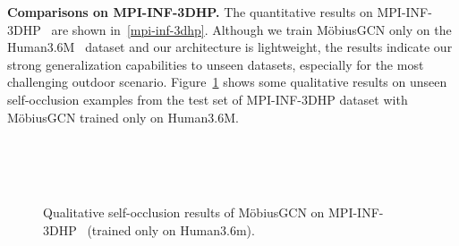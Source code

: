 \documentclass[runningheads]{llncs}
\begin{document}
\textbf{Comparisons on MPI-INF-3DHP.} The quantitative results on MPI-INF-3DHP~\cite{mono-3dhp2017} are shown in~\autoref{mpi-inf-3dhp}. Although we train M\"obiusGCN only on the Human3.6M~\cite{h36m_pami} dataset and our architecture is lightweight, the results indicate our strong generalization capabilities to unseen datasets, especially for the most challenging outdoor scenario.
Figure~\ref{qual-res-mpi-inf} shows some qualitative results on unseen self-occlusion examples from the test set of MPI-INF-3DHP dataset with M\"obiusGCN trained only on Human3.6M. 
\begin{figure}
\centering
{}
\quad
{}
\quad
{}\\ 
\quad
{}
\quad
{} \\
\quad
{}
\quad
{} \\
\caption{\scriptsize{Qualitative self-occlusion results of M\"obiusGCN on MPI-INF-3DHP~\cite{mono-3dhp2017} (trained only on Human3.6m).}}
\label{qual-res-mpi-inf}
\end{figure}
\end{document}
